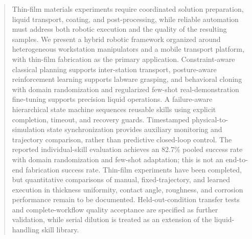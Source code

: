 \begin{abstract}
Thin-film materials experiments require coordinated solution preparation, liquid transport, coating, and post-processing, while reliable automation must address both robotic execution and the quality of the resulting samples. We present a hybrid robotic framework organized around heterogeneous workstation manipulators and a mobile transport platform, with thin-film fabrication as the primary application. Constraint-aware classical planning supports inter-station transport, posture-aware reinforcement learning supports labware grasping, and behavioral cloning with domain randomization and regularized few-shot real-demonstration fine-tuning supports precision liquid operations. A failure-aware hierarchical state machine sequences reusable skills using explicit completion, timeout, and recovery guards. Timestamped physical-to-simulation state synchronization provides auxiliary monitoring and trajectory comparison, rather than predictive closed-loop control. The reported individual-skill evaluation achieves an 82.7\% pooled success rate with domain randomization and few-shot adaptation; this is not an end-to-end fabrication success rate. Thin-film experiments have been completed, but quantitative comparisons of manual, fixed-trajectory, and learned execution in thickness uniformity, contact angle, roughness, and corrosion performance remain to be documented. Held-out-condition transfer tests and complete-workflow quality acceptance are specified as further validation, while serial dilution is treated as an extension of the liquid-handling skill library.
\end{abstract}
